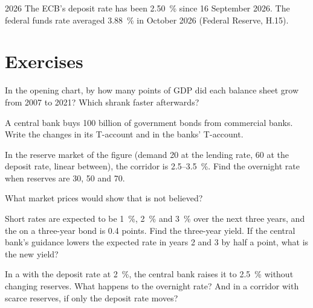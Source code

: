 \begin{dated}{2026}
The ECB's deposit rate has been 2.50~\% since 16 September 2026. %
The federal funds rate averaged 3.88~\% in October 2026 (Federal Reserve, H.15).
\end{dated}

\section{Exercises}\label{sec:b3:central-banking:exercises}

\begin{exercise}[$\star$]\label{exo:b3:central-banking:1}
In the opening chart, by how many points of GDP did each balance sheet grow from
2007 to 2021? Which shrank faster afterwards?
\end{exercise}

\begin{exercise}[$\star$]\label{exo:b3:central-banking:2}
A central bank buys 100 billion of government bonds from commercial banks. Write
the changes in its T-account and in the banks' T-account.
\end{exercise}

\begin{exercise}[$\star$]\label{exo:b3:central-banking:3}
In the reserve market of the figure (demand 20 at the lending rate, 60 at the
deposit rate, linear between), the corridor is 2.5--3.5~\%. Find the overnight rate
when reserves are 30, 50 and 70.
\end{exercise}

\begin{exercise}[$\star$]\label{exo:b3:central-banking:4}
What market prices would show that  is not believed?
\end{exercise}

\begin{exercise}[$\star\star$]\label{exo:b3:central-banking:5}
Short rates are expected to be 1~\%, 2~\% and 3~\% over the next three years, and the
 on a three-year bond is 0.4 points. Find the three-year yield. If the
central bank's guidance lowers the expected rate in years 2 and 3 by half a point,
what is the new yield?
\end{exercise}

\begin{exercise}[$\star\star$]\label{exo:b3:central-banking:6}
In a  with the deposit rate at 2~\%, the central bank raises it to 2.5~\%
without changing reserves. What happens to the overnight rate? And in a corridor
with scarce reserves, if only the deposit rate moves?
\end{exercise}

